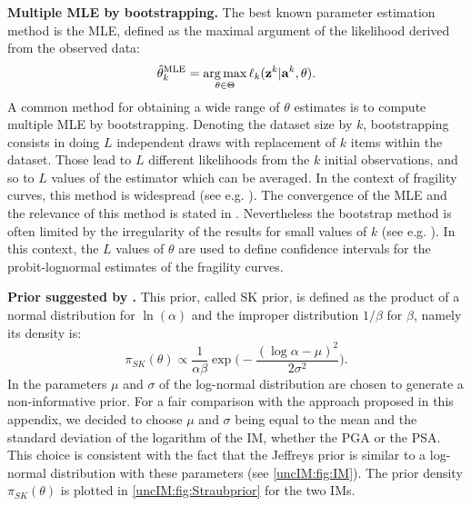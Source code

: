             {\bf Multiple MLE by bootstrapping.}
            The best known parameter estimation method is the MLE, defined as the maximal argument of the likelihood derived from the observed data:
            \begin{equation} \label{uncIM:eq:MLE}
                \hat\theta^{\mathrm{MLE}}_k = \operatorname*{arg\,max}_{\theta\in\Theta} \ell_k(\mathbf{z}^k|\mathbf{a}^k, \theta).
            \end{equation}
            A common method for obtaining a wide range of $\theta$  estimates is to compute multiple MLE by bootstrapping. Denoting the dataset size by $k$, bootstrapping consists in doing $L$ independent draws with replacement of $k$ items within the dataset. Those lead to $L$ different likelihoods from the $k$ initial observations, and so to $L$ values of the estimator which can be averaged. In the context of fragility curves, this method is widespread (see e.g. \cite{shinozuka_statistical_2000,lallemant_statistical_2015,gehl_influence_2015,baker_efficient_2015,wang_influence_2020}). The convergence of the MLE and the relevance of this method is stated in \cite{van_der_vaart_asymptotic_1992}. Nevertheless the bootstrap method is often limited by the irregularity of the results for small values of $k$ (see e.g. \cite{zentner_fragility_2017}). In this context, the $L$ values of $\theta$ are used to define confidence intervals for the probit-lognormal estimates of the fragility curves.
 
        
        {\bf Prior suggested by \citet{straub_improved_2008}.}
        This prior, called SK prior, is defined as the product of a normal distribution for $\ln(\alpha)$ and the improper distribution $1/\beta$ for $\beta$, namely its density is:
                \begin{equation} \label{uncIM:eq:Straubprior}
                    \pi_{SK}(\theta)\propto\frac{1}{\alpha\beta} \exp\Big( -\frac{(\log\alpha-\mu)^2}{2\sigma^2}\Big).
                \end{equation}
        In \cite{straub_improved_2008} the parameters $\mu$ and $\sigma$ of the log-normal distribution are chosen to generate a non-informative prior. For a fair comparison with the approach proposed in this appendix, we decided to choose $\mu$ and $\sigma$ being equal to the mean and the standard deviation of the logarithm of the IM, whether the PGA or the PSA. This choice is consistent with the fact that the Jeffreys prior is similar to a log-normal distribution with these parameters (see \cref{uncIM:fig:IM}). The prior density $\pi_{SK}(\theta)$ is plotted in \cref{uncIM:fig:Straubprior} for the two IMs.

